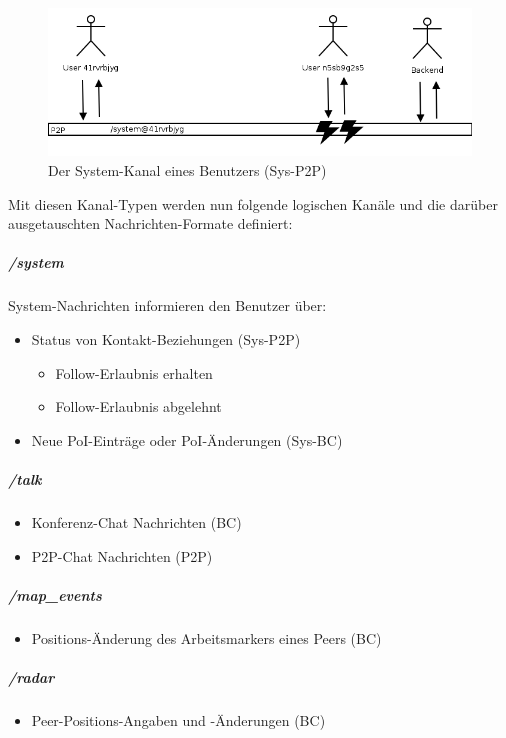   \begin{figure}[H]
      \centering
	  \includegraphics[scale=0.47]{bilder/ps_infrastructure_2.png}
  	  \caption{Der System-Kanal eines Benutzers (Sys-P2P)}
  \end{figure}
\noindent
Mit diesen Kanal-Typen werden nun folgende logischen Kanäle und die darüber ausgetauschten Nachrichten-Formate definiert:
\subparagraph{/system}
System-Nachrichten informieren den Benutzer über:
\begin{itemize}[leftmargin=*,noitemsep,topsep=1ex,parsep=0pt,partopsep=0pt]
	\item Status von Kontakt-Beziehungen (Sys-P2P)
	\begin{itemize}
		\item Follow-Erlaubnis erhalten
		\item Follow-Erlaubnis abgelehnt
	\end{itemize}
	\item Neue PoI-Einträge oder PoI-Änderungen (Sys-BC)
\end{itemize}
\subparagraph{/talk}
	\begin{itemize}[leftmargin=*,noitemsep,topsep=1ex,parsep=0pt,partopsep=0pt]
		\item Konferenz-Chat Nachrichten (BC)
		\item P2P-Chat Nachrichten (P2P)
	\end{itemize}
\subparagraph{/map\_events}
	\begin{itemize}[leftmargin=*,noitemsep,topsep=1ex,parsep=0pt,partopsep=0pt]
		\item Positions-Änderung des Arbeitsmarkers eines Peers (BC)
	\end{itemize}
\subparagraph{/radar}
	\begin{itemize}[leftmargin=*,noitemsep,topsep=1ex,parsep=0pt,partopsep=0pt]
		\item Peer-Positions-Angaben und -Änderungen (BC)
	\end{itemize}
